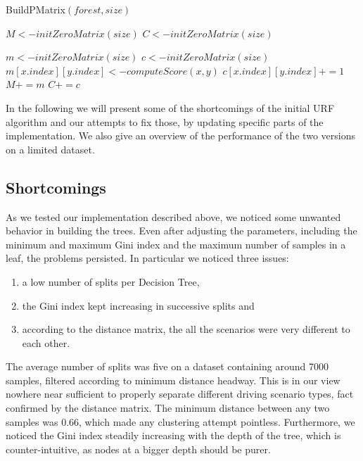 \documentclass[conference]{IEEEtran}
\begin{document}
\begin{algorithm}[!h]
  \caption{BuildPMatrix$(forest, size)$}
  \label{proximity}
  \begin{algorithmic}[1]
  
    \STATE $M<-initZeroMatrix(size)$
    \STATE $C<-initZeroMatrix(size)$
    
    \STATE $m<-initZeroMatrix(size)$
    \STATE $c<-initZeroMatrix(size)$
       \STATE $m[x.index][y.index]<- computeScore(x,y)$
       \STATE $c[x.index][y.index]+=1$
        \ENDFOR
    \ENDFOR
    \STATE $M+=m$
    \STATE $C+=c$
    \ENDFOR
	\end{algorithmic}
\end{algorithm}


In the following we will present some of the shortcomings of the initial URF algorithm and our attempts to fix those, by updating specific parts of the implementation. We also give an overview of the performance of the two versions on a limited dataset.
\subsection{Shortcomings}\label{short}
As we tested our implementation described above, we noticed some unwanted behavior in building the trees. Even after adjusting the parameters, including the minimum and maximum Gini index and the maximum number of samples in a leaf, the problems persisted. In particular we noticed three issues:
\begin{enumerate}
\item a low number of splits per Decision Tree,
\item the Gini index kept increasing in successive splits and
\item according to the distance matrix, the all the scenarios were very different to each other.
\end{enumerate}
The average number of splits was five on a dataset containing around 7000 samples, filtered according to minimum distance headway. This is in our view nowhere near sufficient to properly separate different driving scenario types, fact confirmed by the distance matrix. The minimum distance between any two samples was 0.66, which made any clustering attempt pointless. Furthermore, we noticed the Gini index steadily increasing with the depth of the tree, which is counter-intuitive, as nodes at a bigger depth should be purer.
\end{document}
